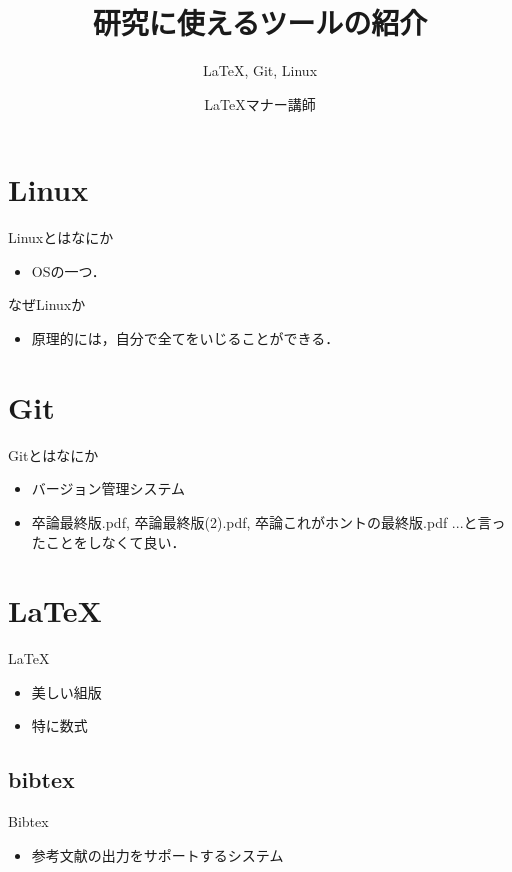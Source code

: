 \documentclass[dvipdfmx]{beamer}
\author[\LaTeX マナー講師]{\LaTeX マナー講師}
\institute[Univ. Toyama]{University of Toyama}
\title[\textcolor{white}{ツールの紹介}]{研究に使えるツールの紹介}
\subtitle{\LaTeX, Git, Linux}
\theoremstyle{break}
\begin{document}
\begin{frame}
		\maketitle
\end{frame}
\begin{frame}
		\tableofcontents
\end{frame}
\section{Linux}
\begin{frame}{Linuxとはなにか}
		\begin{itemize}
				\item OSの一つ．
		\end{itemize}
\end{frame}
\begin{frame}{なぜLinuxか}
		\begin{itemize}
				\item 原理的には，自分で全てをいじることができる．
		\end{itemize}
\end{frame}
\section{Git}
\begin{frame}{Gitとはなにか}
		\begin{itemize}
				\item バージョン管理システム
				\item 卒論最終版.pdf, 卒論最終版(2).pdf, 卒論これがホントの最終版.pdf ...と言ったことをしなくて良い．
		\end{itemize}
\end{frame}

\section{LaTeX}
\begin{frame}{\LaTeX}
		\begin{itemize}
				\item 美しい組版
				\item 特に数式
		\end{itemize}
\end{frame}
\subsection{bibtex}
\begin{frame}{Bibtex}
		\begin{itemize}
				\item 参考文献の出力をサポートするシステム
		\end{itemize}
\end{frame}
\end{document}
